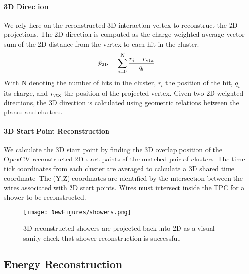 \documentclass[12pt]{article}
\begin{document}
\paragraph{3D Direction}  We rely here on the reconstructed 3D interaction vertex to reconstruct the 2D projections. The 2D direction is computed as the charge-weighted average vector sum of the 2D distance from the vertex to each hit in the cluster.
\begin{equation}
  \hat{p}_{\rm 2D} = \sum_{i=0}^{N} \frac{ r_i - r_{\rm vtx} } { q_i }
\end{equation}
With N denoting the number of hits in the cluster, $r_i$ the position of the hit, $q_i$ its charge, and $r_{\rm vtx}$ the position of the projected vertex. Given two 2D weighted directions, the 3D direction is calculated using geometric relations between the planes and clusters. 

\paragraph{3D Start Point Reconstruction} We calculate the 3D start point by finding the 3D overlap position of the OpenCV reconstructed 2D start points of the matched pair of clusters. The time tick coordinates from each cluster are averaged to calculate a 3D shared time coordinate. The (Y,Z) coordinates are identified by the intersection between the wires associated with 2D start points.  Wires must intersect inside the TPC for a shower to be reconstructed. 

\begin{figure}[h!] %
\centering
\texttt{[image: NewFigures/showers.png]}
\caption{3D reconstructed showers are projected back into 2D as a visual sanity check that shower reconstruction is successful.}
\label{fig:showers}
\end{figure}

\subsection{Energy Reconstruction}
\label{sec:ereco}
\end{document}
